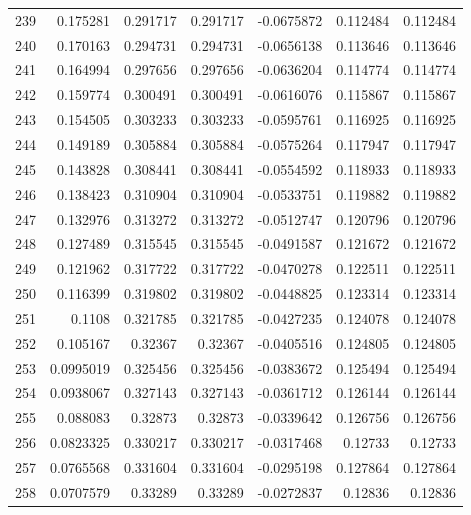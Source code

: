\begin{tabular}{rrrrrrr}
 239 &  0.175281    & 0.291717    & 0.291717    & -0.0675872   & 0.112484    & 0.112484    \\
 240 &  0.170163    & 0.294731    & 0.294731    & -0.0656138   & 0.113646    & 0.113646    \\
 241 &  0.164994    & 0.297656    & 0.297656    & -0.0636204   & 0.114774    & 0.114774    \\
 242 &  0.159774    & 0.300491    & 0.300491    & -0.0616076   & 0.115867    & 0.115867    \\
 243 &  0.154505    & 0.303233    & 0.303233    & -0.0595761   & 0.116925    & 0.116925    \\
 244 &  0.149189    & 0.305884    & 0.305884    & -0.0575264   & 0.117947    & 0.117947    \\
 245 &  0.143828    & 0.308441    & 0.308441    & -0.0554592   & 0.118933    & 0.118933    \\
 246 &  0.138423    & 0.310904    & 0.310904    & -0.0533751   & 0.119882    & 0.119882    \\
 247 &  0.132976    & 0.313272    & 0.313272    & -0.0512747   & 0.120796    & 0.120796    \\
 248 &  0.127489    & 0.315545    & 0.315545    & -0.0491587   & 0.121672    & 0.121672    \\
 249 &  0.121962    & 0.317722    & 0.317722    & -0.0470278   & 0.122511    & 0.122511    \\
 250 &  0.116399    & 0.319802    & 0.319802    & -0.0448825   & 0.123314    & 0.123314    \\
 251 &  0.1108      & 0.321785    & 0.321785    & -0.0427235   & 0.124078    & 0.124078    \\
 252 &  0.105167    & 0.32367     & 0.32367     & -0.0405516   & 0.124805    & 0.124805    \\
 253 &  0.0995019   & 0.325456    & 0.325456    & -0.0383672   & 0.125494    & 0.125494    \\
 254 &  0.0938067   & 0.327143    & 0.327143    & -0.0361712   & 0.126144    & 0.126144    \\
 255 &  0.088083    & 0.32873     & 0.32873     & -0.0339642   & 0.126756    & 0.126756    \\
 256 &  0.0823325   & 0.330217    & 0.330217    & -0.0317468   & 0.12733     & 0.12733     \\
 257 &  0.0765568   & 0.331604    & 0.331604    & -0.0295198   & 0.127864    & 0.127864    \\
 258 &  0.0707579   & 0.33289     & 0.33289     & -0.0272837   & 0.12836     & 0.12836     \\

\end{tabular}
